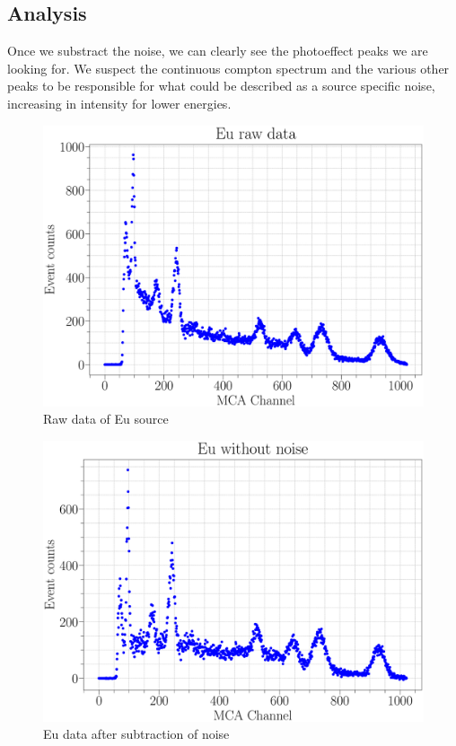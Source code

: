 \documentclass[a4paper,12pt]{article}
\begin{document}
\subsection{Analysis}
Once we substract the noise, we can clearly see the photoeffect peaks we are looking for. We suspect the continuous compton spectrum and the various other peaks to be responsible for what could be described as a source specific noise, increasing in intensity for lower energies.

\begin{figure}[H]
\centering
\includegraphics[scale=0.3]{../Figures/Eu_raw.eps}
\caption{Raw data of Eu source}
\label{Eu_raw}
\end{figure}

\begin{figure}[H]
\centering
\includegraphics[scale=0.3]{../Figures/Eu_nonoise.eps}
\caption{Eu data after subtraction of noise}
\label{Eu}
\end{figure}
\end{document}
